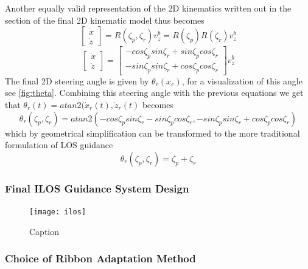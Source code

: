 Another equally valid representation of the 2D kinematics written out in the section of the final 2D kinematic model thus becomes
\begin{equation}
    \begin{bmatrix}
        \dot{x} \\\dot{z}
    \end{bmatrix} = R(\zeta_p, \zeta_r)v_z^b = R(\zeta_p)R(\zeta_r)v_z^b
\end{equation}
\begin{equation}
    \begin{bmatrix}
        \dot{x} \\ \dot{z} 
    \end{bmatrix} = \begin{bmatrix}
        -cos\zeta_p sin\zeta_r + sin\zeta_p cos \zeta_r \\
        -sin\zeta_p sin \zeta_r + cos \zeta_p cos \zeta_r
    \end{bmatrix} v_z^b
\end{equation}
The final 2D steering angle is given by \(\theta_r(x_e)\), for a visualization of this angle see \ref{fig:theta}. Combining this steering angle with the previous equations we get that  \(\theta_r(t) = atan2(\dot{x}_r(t), \dot{z}_r(t)\)  becomes
\begin{equation}
    \theta_r(\zeta_p, \zeta_r) = atan2(-cos\zeta_p sin\zeta_r - sin\zeta_p cos \zeta_r, -sin\zeta_p sin \zeta_r + cos\zeta_pcos \zeta_r)
\end{equation}
which by geometrical simplification can be transformed to the more traditional formulation of LOS guidance
\begin{equation}
    \theta_r(\zeta_p, \zeta_r) = \zeta_p + \zeta_r
\end{equation}

\subsubsection{Final ILOS Guidance System Design}

\begin{figure}
    \centering
    \texttt{[image: ilos]}
    \caption{Caption}
    \label{fig:enter-label}
\end{figure}

\subsubsection{Choice of Ribbon Adaptation Method}







